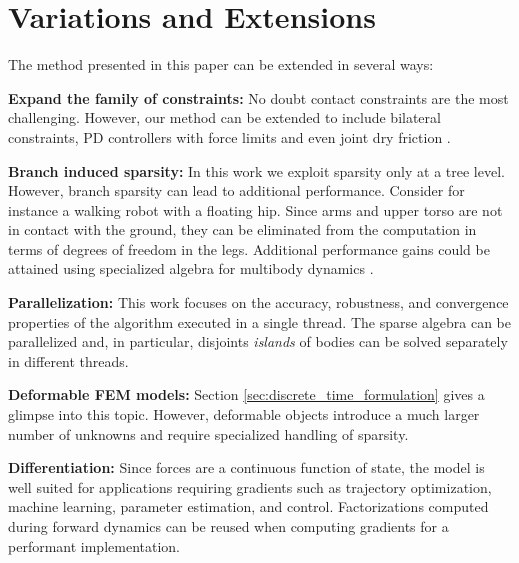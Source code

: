 \section{Variations and Extensions}
\label{sec:variations_and_extensions}

The method presented in this paper can be extended in several ways:

\textbf{Expand the family of constraints:} No doubt contact constraints are the most challenging. However, our method can be extended to include bilateral constraints, PD controllers with force limits and even joint dry friction \cite{bib:todorov2014}.

\textbf{Branch induced sparsity:} In this work we exploit sparsity only at a tree level. However, branch sparsity can lead to additional performance. Consider for instance a walking robot with a floating hip. Since arms and upper torso are not in contact with the ground, they can be eliminated from the computation in terms of degrees of freedom in the legs. Additional performance gains could be attained using specialized algebra for multibody dynamics \cite{bib:carpentier2021}.

\textbf{Parallelization:} This work focuses on the accuracy, robustness, and convergence properties of the algorithm executed in a single thread. The sparse algebra can be parallelized and, in particular, disjoints \emph{islands} of bodies can be solved separately in different threads.

\textbf{Deformable FEM models:} Section \ref{sec:discrete_time_formulation} gives a glimpse into this topic. However, deformable objects introduce a much larger number of unknowns and require specialized handling of sparsity.

\textbf{Differentiation:} Since forces are a continuous function of state, the model is well suited for applications requiring gradients such as trajectory optimization, machine learning, parameter estimation, and control. Factorizations computed during forward dynamics can be reused when computing gradients for a performant implementation.

